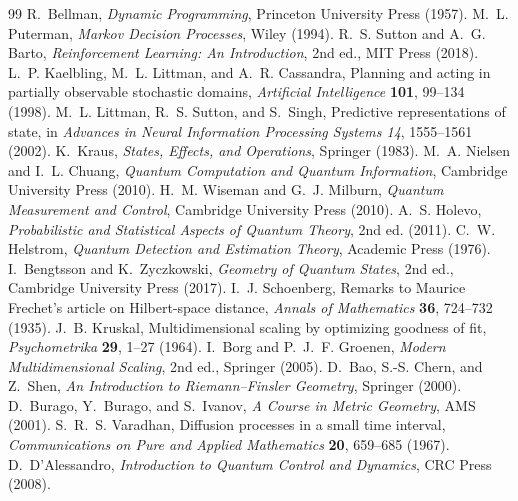 \documentclass[11pt]{article}
\theoremstyle{definition}\newtheorem{definition}[theorem]{Definition}
\theoremstyle{remark}\newtheorem{remark}[theorem]{Remark}
\begin{document}
\begin{thebibliography}{99}
 R.~Bellman, \emph{Dynamic Programming}, Princeton
University Press (1957).
 M.~L. Puterman, \emph{Markov Decision Processes},
Wiley (1994).
 R.~S. Sutton and A.~G. Barto,
\emph{Reinforcement Learning: An Introduction}, 2nd ed., MIT Press (2018).
 L.~P. Kaelbling, M.~L. Littman, and A.~R. Cassandra,
Planning and acting in partially observable stochastic domains,
\emph{Artificial Intelligence} \textbf{101}, 99--134 (1998).
 M.~L. Littman, R.~S. Sutton, and S.~Singh,
Predictive representations of state, in \emph{Advances in Neural Information
Processing Systems 14}, 1555--1561 (2002).
 K.~Kraus, \emph{States, Effects, and Operations},
Springer (1983).
 M.~A. Nielsen and I.~L. Chuang,
\emph{Quantum Computation and Quantum Information}, Cambridge University
Press (2010).
 H.~M. Wiseman and G.~J. Milburn,
\emph{Quantum Measurement and Control}, Cambridge University Press (2010).
 A.~S. Holevo,
\emph{Probabilistic and Statistical Aspects of Quantum Theory}, 2nd ed.
(2011).
 C.~W. Helstrom,
\emph{Quantum Detection and Estimation Theory}, Academic Press (1976).
 I.~Bengtsson and K.~Zyczkowski,
\emph{Geometry of Quantum States}, 2nd ed., Cambridge University Press (2017).
 I.~J. Schoenberg, Remarks to Maurice Frechet's
article on Hilbert-space distance, \emph{Annals of Mathematics}
\textbf{36}, 724--732 (1935).
 J.~B. Kruskal, Multidimensional scaling by optimizing
goodness of fit, \emph{Psychometrika} \textbf{29}, 1--27 (1964).
 I.~Borg and P.~J.~F. Groenen,
\emph{Modern Multidimensional Scaling}, 2nd ed., Springer (2005).
 D.~Bao, S.-S. Chern, and Z.~Shen,
\emph{An Introduction to Riemann--Finsler Geometry}, Springer (2000).
 D.~Burago, Y.~Burago, and S.~Ivanov,
\emph{A Course in Metric Geometry}, AMS (2001).
 S.~R.~S. Varadhan, Diffusion processes in a small time
interval, \emph{Communications on Pure and Applied Mathematics}
\textbf{20}, 659--685 (1967).
 D.~D'Alessandro,
\emph{Introduction to Quantum Control and Dynamics}, CRC Press (2008).
\end{thebibliography}
\end{document}
